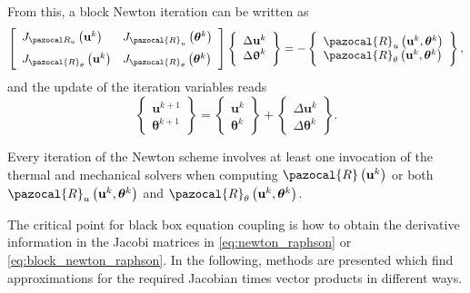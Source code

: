 From this, a block Newton iteration can be written as
\begin{equation} \label{eq:block_newton_raphson}
\left[\begin{array}{ll}J_{\pazocal R_{u}}\left(\mathbf{u}^{k}\right) & J_{\pazocal{R}_{u}}\left(\boldsymbol{\theta}^{k}\right) \\[7pt] J_{\pazocal{R}_{\theta}}\left(\mathbf{u}^{k}\right) & J_{\pazocal{R}_{\theta}}\left(\boldsymbol{\theta}^{k}\right)\end{array}\right]
\left\{\begin{array}{c}\Delta \mathbf{u}^{k} \\ \Delta \bm{\uptheta}^{k}\end{array}\right\}
=-\left\{\begin{array}{l}\pazocal{R}_{u}\left(\mathbf{u}^{k}, \boldsymbol{\theta}^{k}\right) \\ \pazocal{R}_{\theta}\left(\mathbf{u}^{k}, \boldsymbol{\theta}^{k}\right)\end{array}\right\},
\end{equation}
and the update of the iteration variables reads
\begin{equation}
\left\{\begin{array}{l}
\mathbf{u}^{k+1} \\
\boldsymbol{\theta}^{k+1}
\end{array}\right\}=\left\{\begin{array}{l}
\mathbf{u}^{k} \\
\boldsymbol{\theta}^{k}
\end{array}\right\}+\left\{\begin{array}{c}
\Delta \mathbf{u}^{k} \\
\Delta \boldsymbol{\theta}^{k}
\end{array}\right\}.
\end{equation}

Every iteration of the Newton scheme involves at least one invocation of the thermal and mechanical solvers when computing $\pazocal{R}\left(\mathbf{u}^{k}\right)$ or both $\pazocal{R}_{u}\left(\mathbf{u}^{k}, \boldsymbol{\theta}^{k}\right)$ and $\pazocal{R}_{\theta}\left(\mathbf{u}^{k}, \boldsymbol{\theta}^{k}\right)$.

The critical point for black box equation coupling is how to obtain the derivative information in the Jacobi matrices in \eqref{eq:newton_raphson} or \eqref{eq:block_newton_raphson}.
In the following, methods are presented which find approximations for the required Jacobian times vector products in different ways.


